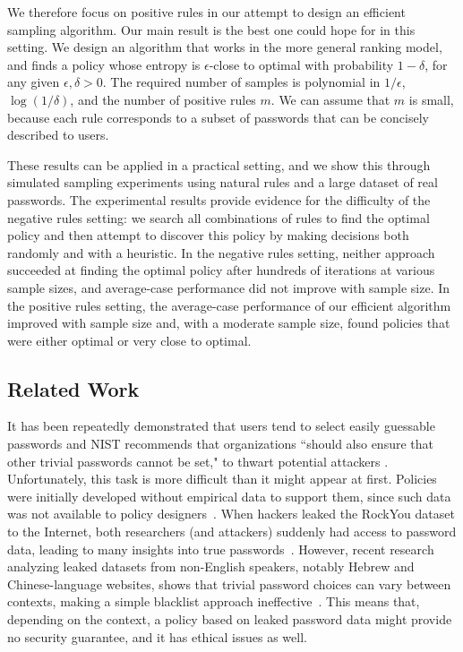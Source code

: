 \documentclass[prodmode,acmec]{ec-acmsmall}
\begin{document}
{We therefore focus on positive rules in our attempt to design an efficient sampling algorithm. Our main result is the best one could hope for in this setting. We design an algorithm that works in the more general ranking model, and finds a policy whose entropy is $\epsilon$-close to optimal with probability $1-\delta$, for any given $\epsilon,\delta>0$. The required number of samples is polynomial in $1/\epsilon$, $\log(1/\delta)$, and the number of positive rules $m$. We can assume that $m$ is small, because each rule corresponds to a subset of passwords that can be concisely described to users.

These results can be applied in a practical setting, and we show this through simulated sampling experiments using natural rules and a large dataset of real passwords. The experimental results provide evidence for the difficulty of the negative rules setting: we search all combinations of rules to find the optimal policy and then attempt to discover this policy by making decisions both randomly and with a heuristic. In the negative rules setting, neither approach succeeded at finding the optimal policy after hundreds of iterations at various sample sizes, and average-case performance did not improve with sample size. In the positive rules setting, the average-case performance of our efficient algorithm improved with sample size and, with a moderate sample size, found policies that were either optimal or very close to optimal. 

}
\else

\fi

\subsection{Related Work}



It has been repeatedly demonstrated that users tend to select easily guessable passwords \cite{rockYouPasswords,mostPopularPasswords2012,bonneau2012science} and NIST recommends that organizations ``should also ensure that other trivial passwords cannot be set," to thwart potential attackers \cite{NIST-Passwords}. Unfortunately, this task is more difficult than it might appear at first. Policies were initially developed without empirical data to support them, since such data was not available to policy designers~\cite{burr_electronic_2006}. When hackers leaked the RockYou dataset to the Internet, both researchers (and attackers) suddenly had access to password data, leading to many insights into true passwords~\cite{weir_testing_2010}. However, recent research analyzing leaked datasets from non-English speakers, notably Hebrew and Chinese-language websites, shows that trivial password choices can vary between contexts, making a simple blacklist approach ineffective~\cite{bonneau_contrasenas_2012}. This means that, depending on the context, a policy based on leaked password data might provide no security guarantee, and it has ethical issues as well.
\end{document}
